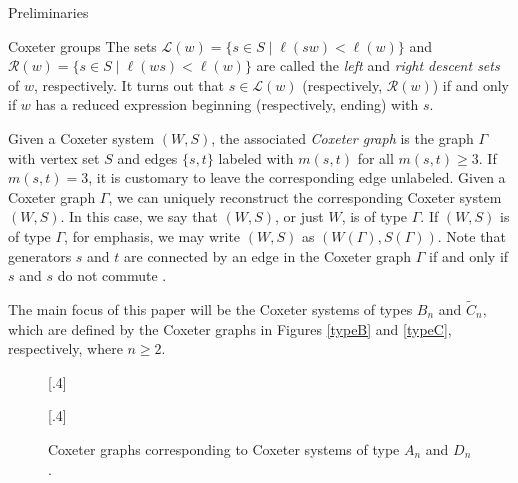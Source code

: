 \documentclass[11pt]{amsart}
\theoremstyle{definition}
\numberwithin{equation}{section}
\newcommand{\C}{\widetilde{C}}
\newcommand{\x}{\mathsf{x}}
\renewcommand{\L}{\mathcal{L}}
\newcommand{\R}{\mathcal{R}}
\renewcommand{\(}{\left(}
\renewcommand{\)}{\right)}
\begin{document}
\begin{section}{Preliminaries}
\begin{subsection}{Coxeter groups}
The sets $\L(w)=\{s \in S\mid \ell(sw) < \ell(w)\}$ and $\R(w)=\{s \in S\mid \ell(ws) < \ell(w)\}$ are called the \emph{left} and \emph{right descent sets} of $w$, respectively.  It turns out that $s \in \L(w)$ (respectively, $\R(w)$) if and only if $w$ has a reduced expression beginning (respectively, ending) with $s$.

Given a Coxeter system $(W,S)$, the associated \emph{Coxeter graph} is the graph $\Gamma$ with vertex set $S$ and edges $\{s,t\}$ labeled with $m(s,t)$ for all $m(s,t)\geq 3$.  If $m(s,t)=3$, it is customary to leave the corresponding edge unlabeled.  Given a Coxeter graph $\Gamma$, we can uniquely reconstruct the corresponding Coxeter system $(W,S)$.  In this case, we say that $(W,S)$, or just $W$, is of type $\Gamma$. If $(W,S)$ is of type $\Gamma$, for emphasis, we may write $(W,S)$ as $(W(\Gamma),S(\Gamma))$.  Note that generators $s$ and $t$ are connected by an edge in the Coxeter graph $\Gamma$ if and only if $s$ and $s$ do not commute \cite{Humphreys1990}.

The main focus of this paper will be the Coxeter systems of types $B_n$ and $\C_n$, which are defined by the Coxeter graphs in Figures \ref{typeB} and \ref{typeC}, respectively, where $n\geq 2$.

\begin{figure}[!ht]
[.4\textwidth]{
}
\subcaptionbox{Type $\C_n$\label{typeC}}[.4\textwidth]{
}
\caption{Coxeter graphs corresponding to Coxeter systems of type $A_{n}$ and $D_{n}$.}
\end{figure}


\end{subsection}
\end{section}
\end{document}
